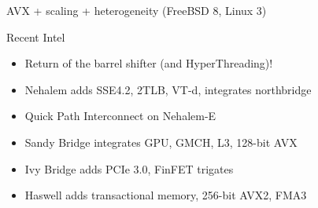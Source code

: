 \documentclass[mathserif,xcolor={dvipsnames,table}]{beamer}
\begin{document}
\begin{frame}[t]{AVX + scaling + heterogeneity (FreeBSD 8, Linux 3)}
\begin{block}{Recent Intel}
\begin{itemize}
\item Return of the barrel shifter (and HyperThreading)!
\item Nehalem adds SSE4.2, 2TLB, VT-d, integrates northbridge
\item Quick Path Interconnect on Nehalem-E
\item Sandy Bridge integrates GPU, GMCH, L3, 128-bit AVX
\item Ivy Bridge adds PCIe 3.0, FinFET trigates
\item Haswell adds transactional memory, 256-bit AVX2, FMA3
\end{itemize}
\end{block}
\vfill
\begin{center}
\end{center}
\end{frame}
\end{document}
